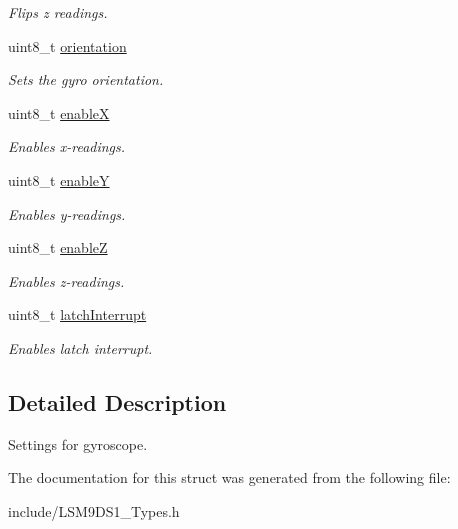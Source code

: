 \begin{DoxyCompactItemize}
\begin{DoxyCompactList}\small\item\em Flips z readings. \end{DoxyCompactList}\item 
\mbox{\label{structgyroSettings_a33239fd5c4a0fd74670455008c2701ee}} 
uint8\+\_\+t \hyperlink{structgyroSettings_a33239fd5c4a0fd74670455008c2701ee}{orientation}
\begin{DoxyCompactList}\small\item\em Sets the gyro orientation. \end{DoxyCompactList}\item 
\mbox{\label{structgyroSettings_a7c1000d1151579743faa376d49751f1d}} 
uint8\+\_\+t \hyperlink{structgyroSettings_a7c1000d1151579743faa376d49751f1d}{enableX}
\begin{DoxyCompactList}\small\item\em Enables x-\/readings. \end{DoxyCompactList}\item 
\mbox{\label{structgyroSettings_a4d6ea95b7a52daab6d48dc128c83f3d8}} 
uint8\+\_\+t \hyperlink{structgyroSettings_a4d6ea95b7a52daab6d48dc128c83f3d8}{enableY}
\begin{DoxyCompactList}\small\item\em Enables y-\/readings. \end{DoxyCompactList}\item 
\mbox{\label{structgyroSettings_a86a86182fd841bd651672d43803b5c63}} 
uint8\+\_\+t \hyperlink{structgyroSettings_a86a86182fd841bd651672d43803b5c63}{enableZ}
\begin{DoxyCompactList}\small\item\em Enables z-\/readings. \end{DoxyCompactList}\item 
\mbox{\label{structgyroSettings_a3eb9f52cae013b107fbc5059220f9333}} 
uint8\+\_\+t \hyperlink{structgyroSettings_a3eb9f52cae013b107fbc5059220f9333}{latch\+Interrupt}
\begin{DoxyCompactList}\small\item\em Enables latch interrupt. \end{DoxyCompactList}\end{DoxyCompactItemize}


\subsection{Detailed Description}
Settings for gyroscope. 

The documentation for this struct was generated from the following file\+:\begin{DoxyCompactItemize}
\item 
include/L\+S\+M9\+D\+S1\+\_\+\+Types.\+h\end{DoxyCompactItemize}
